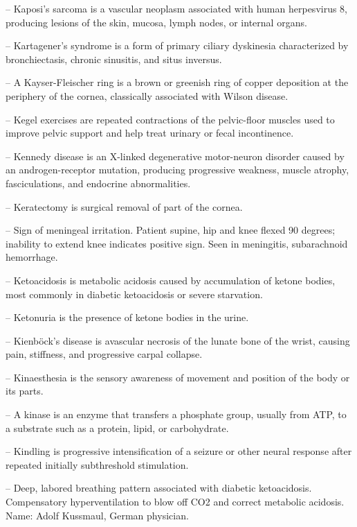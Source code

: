 -- Kaposi's sarcoma is a vascular neoplasm associated with human herpesvirus 8, producing lesions of the skin, mucosa, lymph nodes, or internal organs.

-- Kartagener's syndrome is a form of primary ciliary dyskinesia characterized by bronchiectasis, chronic sinusitis, and situs inversus.

-- A Kayser-Fleischer ring is a brown or greenish ring of copper deposition at the periphery of the cornea, classically associated with Wilson disease.

-- Kegel exercises are repeated contractions of the pelvic-floor muscles used to improve pelvic support and help treat urinary or fecal incontinence.

-- Kennedy disease is an X-linked degenerative motor-neuron disorder caused by an androgen-receptor mutation, producing progressive weakness, muscle atrophy, fasciculations, and endocrine abnormalities.

-- Keratectomy is surgical removal of part of the cornea.

-- Sign of meningeal irritation. Patient supine, hip and knee flexed 90 degrees; inability to extend knee indicates positive sign. Seen in meningitis, subarachnoid hemorrhage.

-- Ketoacidosis is metabolic acidosis caused by accumulation of ketone bodies, most commonly in diabetic ketoacidosis or severe starvation.

-- Ketonuria is the presence of ketone bodies in the urine.

-- Kienböck's disease is avascular necrosis of the lunate bone of the wrist, causing pain, stiffness, and progressive carpal collapse.

-- Kinaesthesia is the sensory awareness of movement and position of the body or its parts.

-- A kinase is an enzyme that transfers a phosphate group, usually from ATP, to a substrate such as a protein, lipid, or carbohydrate.

-- Kindling is progressive intensification of a seizure or other neural response after repeated initially subthreshold stimulation.

-- Deep, labored breathing pattern associated with diabetic ketoacidosis. Compensatory hyperventilation to blow off CO2 and correct metabolic acidosis. Name: Adolf Kussmaul, German physician.


